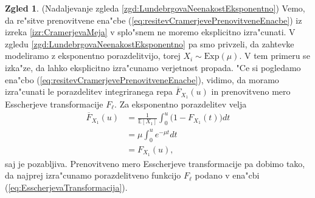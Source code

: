 \documentclass[12pt, a4paper, reqno]{amsart}
\theoremstyle{definition}
\newtheorem{zgled}[definicija]{Zgled}
\theoremstyle{plain}
\newcommand{\E}{\mathbb{E}}
\newcommand{\1}{\mathds{1}}
\begin{document}
            \begin{zgled}(Nadaljevanje zgleda \ref{zgd:LundebrgovaNeenakostEksponentno})
                Vemo, da re"sitve 
                prenovitvene ena"cbe (\ref{eq:resitevCramerjevePrenovitveneEnacbe}) iz izreka \ref{izr:CramerjevaMeja}
                v splo"snem ne moremo eksplicitno izra"cunati.
                V zgledu \ref{zgd:LundebrgovaNeenakostEksponentno} pa smo privzeli, da zahtevke modeliramo 
                z eksponentno porazdelitvijo, torej $X_i\sim\text{Exp}(\mu)$. 
                V tem primeru se izka"ze, da lahko eksplicitno izra"cunamo verjetnost propada.
                "Ce si pogledamo ena"cbo
                (\ref{eq:resitevCramerjevePrenovitveneEnacbe}), vidimo, da moramo 
                izra"cunati le porazdelitev integriranega repa $\overline{F}_{X_1}(u)$ in 
                prenovitveno mero Esscherjeve transformacije $F_\ell$. Za eksponentno porazdelitev
                velja
                \begin{align*}
                    \overline{F}_{X_1}(u)   &= \frac{1}{\E\left[X_1\right]}\int_0^u\bigl(1 - F_{X_1}(t)\bigr)dt \\
                                            &= \mu\int_0^ue^{-\mu t}dt \\
                                            &= F_{X_1}(u),
                \end{align*}
                saj je pozabljiva. Prenovitveno mero Esscherjeve transformacije pa dobimo tako, 
                da najprej izra"cunamo porazdelitveno funkcijo $F_\ell$ podano v ena"cbi (\ref{eq:EsscherjevaTransformacija}). 


\end{zgled}
\end{document}
